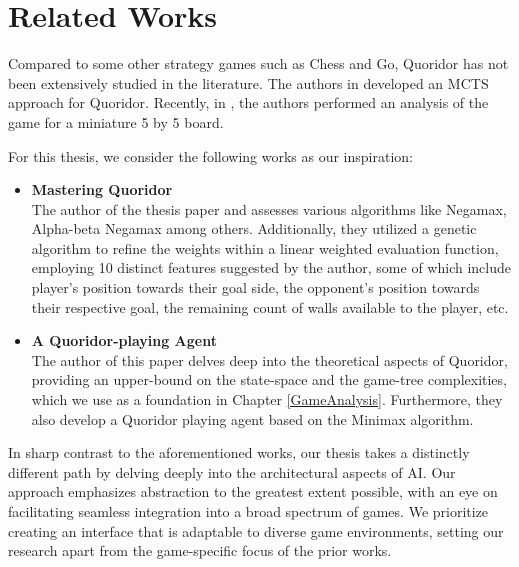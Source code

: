 \chapter{Related Works}

Compared to some other strategy games such as Chess and Go, Quoridor has not been extensively studied in the literature. The authors in \citep{Brenner2015Artificial} developed an \gls{MCTS} approach for Quoridor. Recently, in \citep{Iwanaga2022Analysis}, the authors performed an analysis of the game for a miniature 5 by 5 board.

For this thesis, we consider the following works as our inspiration:

\begin{itemize}
    \item \textbf{Mastering Quoridor \citep{Glendenning2002MasteringQ}}\\
    The author of the thesis paper and assesses various algorithms like Negamax, Alpha-beta Negamax among others. Additionally, they utilized a genetic algorithm to refine the weights within a linear weighted evaluation function, employing 10 distinct features suggested by the author, some of which include player's position towards their goal side, the opponent's position towards their respective goal, the remaining count of walls available to the player, etc.

    \item \textbf{A Quoridor-playing Agent \citep{Mertens2006Quoridor}}\\
    The author of this paper delves deep into the theoretical aspects of Quoridor, providing an upper-bound on the state-space and the game-tree complexities, which we use as a foundation in Chapter \ref{GameAnalysis}.
    Furthermore, they also develop a Quoridor playing agent based on the Minimax algorithm.
    
\end{itemize}

In sharp contrast to the aforementioned works, our thesis takes a distinctly different path by delving deeply into the architectural aspects of AI. Our approach emphasizes abstraction to the greatest extent possible, with an eye on facilitating seamless integration into a broad spectrum of games. We prioritize creating an interface that is adaptable to diverse game environments, setting our research apart from the game-specific focus of the prior works.